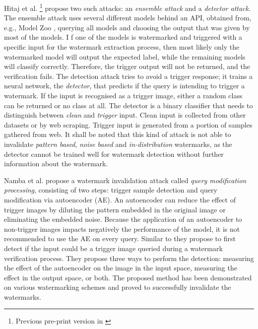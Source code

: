 Hitaj et al. \cite{hitaj_evasion_2019}\footnote{Previous pre-print version in \cite{hitaj_have_2018}} propose two such attacks: an \textit{ensemble attack} and a \textit{detector attack}. The ensemble attack uses several different models behind an API, obtained from, e.g., Model Zoo \cite{noauthor_model_nodate}, querying all models and choosing the output that was given by most of the models. I%
f one of the models is watermarked and triggered with a specific input for the watermark extraction process, then most likely only the watermarked model will output the expected label, while the remaining models will classify correctly. Therefore, the trigger output will not be returned, and the verification fails.
The detection attack tries to avoid a trigger response; it trains a neural network, the \textit{detector}, that predicts if the query is intending to trigger a watermark. If the input is recognised as a trigger image, either a random class can be returned or no class at all. The detector is a binary classifier that needs to distinguish between \textit{clean} and \textit{trigger} input. Clean input is collected from other datasets or by web scraping. Trigger input is generated from a portion of samples gathered from web. It shall be noted that this kind of attack is not able to invalidate \textit{pattern based}, \textit{noise based} and \textit{in-distribution} watermarks, as the detector cannot be trained well for watermark detection without further information about the watermark.

Namba et al. \cite{namba_robust_2019} propose a watermark invalidation attack %
called \textit{query modification processing}, consisting of two steps: trigger sample detection and query modification via autoencoder (AE). An autoencoder can reduce the effect of trigger images by diluting the pattern embedded in the original image or eliminating the embedded noise. Because the application of an autoencoder to non-trigger images impacts negatively the performance of the model, it is not recommended to use the AE on every query. Similar to \cite{hitaj_evasion_2019} they propose to first detect if the input could be a trigger image queried during a watermark verification process. They propose three ways to perform the detection: measuring the effect of the autoencoder on the image in the input space, measuring the effect in the output space, or both.
The proposed method has been demonstrated on various watermarking schemes and proved to successfully invalidate the watermarks.

